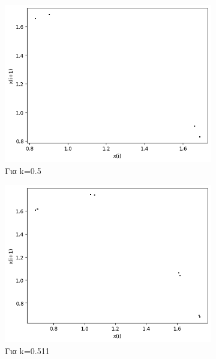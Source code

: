 \begin{figure}[h!]
\begin{subfigure}[b]{0.4\textwidth}
		\includegraphics[width=\textwidth]{LateX images/graphs q03/g5}
		\caption{Για k=0.5}
		\label{f:k17}
	\end{subfigure}
	\hfill
	\begin{subfigure}[b]{0.4\textwidth}
		\centering
		\includegraphics[width=\textwidth]{LateX images/graphs q03/g6}
		\caption{Για k=0.511}
		\label{f:k18}
	\end{subfigure}
	\hfill
	\begin{subfigure}[b]{0.4\textwidth}
		\centering

\end{subfigure}
\end{figure}
